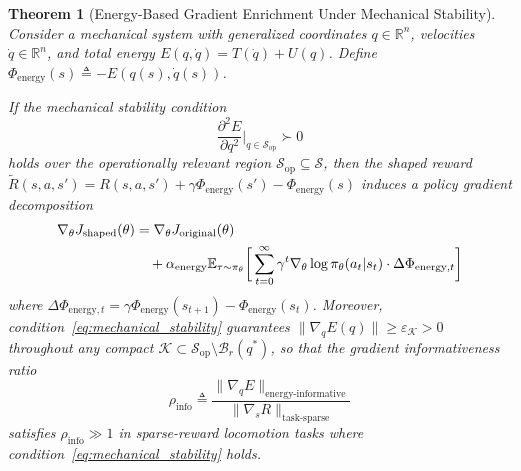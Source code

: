 \documentclass[10pt,a4paper]{amsart}
\newtheorem{theorem}{Theorem}
\begin{document}
	\begin{theorem}[Energy-Based Gradient Enrichment Under Mechanical Stability]
		\label{thm:energy_convergence}
		Consider a mechanical system with generalized coordinates $q\in\mathbb{R}^n$, velocities $\dot{q}\in\mathbb{R}^n$, and total energy $E(q,\dot{q}) = T(\dot{q}) + U(q)$. Define $\Phi_{\text{energy}}(s) \triangleq -E(q(s),\dot{q}(s))$.
		
		If the mechanical stability condition
		\begin{equation}
			\frac{\partial^2 E}{\partial q^2}\bigg|_{q \in \mathcal{S}_{\text{op}}} \succ 0
			\label{eq:mechanical_stability}
		\end{equation}
		holds over the operationally relevant region $\mathcal{S}_{\text{op}}\subseteq\mathcal{S}$, then the shaped reward $\tilde{R}(s,a,s') = R(s,a,s') + \gamma\Phi_{\text{energy}}(s') - \Phi_{\text{energy}}(s)$ induces a policy gradient decomposition
		\begin{align}
			\nabla_\theta J_{\text{shaped}}(\theta) &= \nabla_\theta J_{\text{original}}(\theta) \notag \\
			&\quad + \alpha_{\text{energy}} \mathbb{E}_{\tau\sim\pi_\theta} \bigg[ \sum_{t=0}^{\infty} \gamma^t \nabla_\theta \log \pi_\theta(a_t|s_t) \cdot \Delta\Phi_{\text{energy},t} \bigg]
			\label{eq:gradient_decomposition}
		\end{align}
		where $\Delta\Phi_{\text{energy},t} = \gamma\Phi_{\text{energy}}(s_{t+1}) - \Phi_{\text{energy}}(s_t)$. Moreover, condition~\eqref{eq:mechanical_stability} guarantees $\|\nabla_q E(q)\| \geq \varepsilon_{\mathcal{K}} > 0$ throughout any compact $\mathcal{K}\subset\mathcal{S}_{\text{op}}\setminus\mathcal{B}_r(q^*)$, so that the gradient informativeness ratio
		\begin{equation}
			\rho_{\text{info}} \triangleq \frac{\|\nabla_q E\|_{\text{energy-informative}}}{\|\nabla_s R\|_{\text{task-sparse}}}
			\label{eq:gradient_ratio}
		\end{equation}
		satisfies $\rho_{\text{info}} \gg 1$ in sparse-reward locomotion tasks where condition~\eqref{eq:mechanical_stability} holds.
	\end{theorem}
\end{document}
